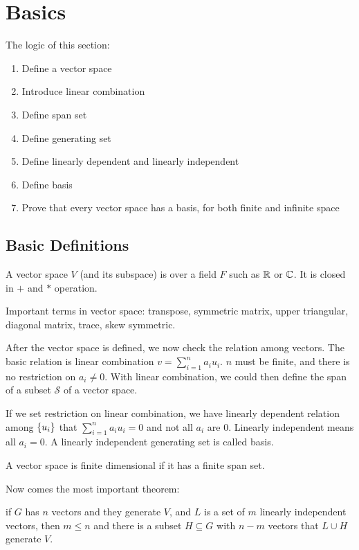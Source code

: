 \chapter{Basics}

The logic of this section:
\begin{enumerate}
    \item Define a vector space
    \item Introduce linear combination
    \item Define span set
    \item Define generating set
    \item Define linearly dependent and linearly independent
    \item Define basis
    \item Prove that every vector space has a basis, for both finite and infinite space
\end{enumerate}

\section{Basic Definitions}



A vector space $V$ (and its subspace) is over a field $F$ such as $\mathbb{R}$ or $\mathbb{C}$. It is closed in $+$ and $*$ operation.


Important terms in vector space: transpose, symmetric matrix, upper triangular, diagonal matrix, trace, skew symmetric.

After the vector space is defined, we now check the relation among vectors. The basic relation is linear combination $v = \sum_{i=1}^{n} a_i u_i$. $n$ must be finite, and there is no restriction on $a_i \neq 0$. With linear combination, we could then define the span of a subset $\mathcal{S}$ of a vector space. 

If we set restriction on linear combination, we have linearly dependent relation among $\set{u_i}$ that $\sum_{i=1}^{n} a_i u_i = 0$ and not all $a_i$ are $0$. Linearly independent means all $a_i = 0$. A linearly independent generating set is called basis.


A vector space is finite dimensional if it has a finite span set.


Now comes the most important theorem:
\begin{theorem}\label{replacement_theorem}
    if $G$ has $n$ vectors and they generate $V$, and $L$ is a set of $m$ linearly independent vectors, then $m \leq n$ and there is a subset $H \subseteq G$ with $n-m$ vectors that $L \cup H $ generate $V$.
    
\end{theorem}

